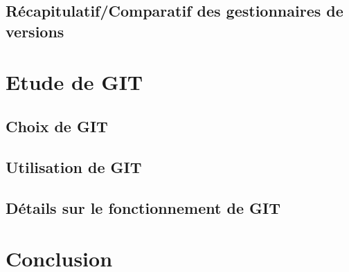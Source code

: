 
\subsection{Récapitulatif/Comparatif des gestionnaires de versions}


\section{Etude de GIT}

\subsection{Choix de GIT}

\subsection{Utilisation de GIT}

\subsection{Détails sur le fonctionnement de GIT}

\section*{Conclusion}



